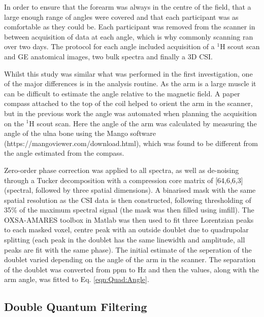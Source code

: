 In order to ensure that the forearm was always in the centre of the field, that a large enough range of angles were covered and that each participant was as comfortable as they could be. Each participant was removed from the scanner in between acquisition of data at each angle, which is why commonly scanning ran over two days. The protocol for each angle included  acquisition of a $^1$H scout scan and \ac{GE} anatomical images, two bulk spectra and finally a 3D \ac{CSI}. 

Whilst this study was similar what was performed in the first investigation, one of the major differences is in the analysis routine. As the arm is a large muscle it can be difficult to estimate the angle relative to the magnetic field. A paper compass attached to the top of the coil helped to orient the arm in the scanner, but in the previous work the angle was automated when planning the acquisition on the $^1$H scout scan. Here the angle of the arm was calculated by measuring the angle of the ulna bone using the Mango software (https://mangoviewer.com/download.html), which was found to be different from the angle estimated from the compass.

Zero-order phase correction was applied to all spectra, as well as de-noising through a Tucker decomposition \cite{Bader2007EfficientTensors} with a compression core matrix of [64,6,6,3] (spectral, followed by three spatial dimensions). A binarised mask with the same spatial resolution as the \ac{CSI} data is then constructed, following thresholding of 35\% of the maximum spectral signal (the mask was then filled using imfill). The OXSA-AMARES \cite{Purvis2017OXSA:MATLAB} toolbox in Matlab was then used to fit three Lorentzian peaks to each masked voxel, centre peak with an outside doublet due to quadrupolar splitting (each peak in the doublet has the same linewidth and amplitude, all peaks are fit with the same phase). The initial estimate of the seperation of the doublet varied depending on the angle of the arm in the scanner. The separation of the doublet was converted from ppm to Hz and then the values, along with the arm angle, was fitted to Eq. \ref{eqn:Quad:Angle}.

\subsection{Double Quantum Filtering}

